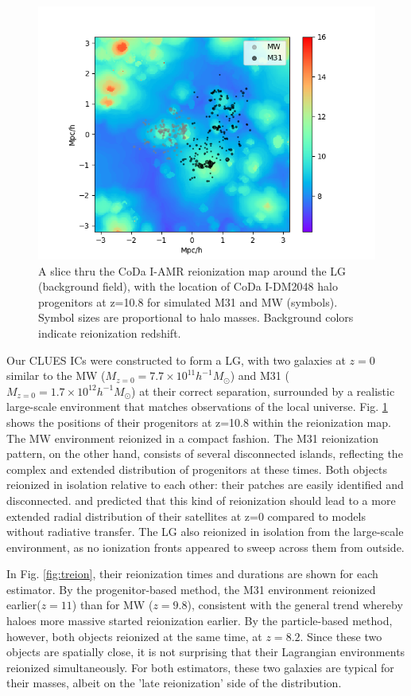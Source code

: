 \documentclass[twocolumn]{aastex61}
\begin{document}
\begin{figure}[ht]
\includegraphics[width=1.2\columnwidth]{img/map_LG_ok.png}
\caption{A slice thru the CoDa I-AMR reionization map around the LG (background field), with the location of CoDa I-DM2048 halo progenitors at z=10.8 for simulated M31 and MW (symbols). Symbol sizes are proportional to halo masses. Background colors indicate reionization redshift.}
\label{fig:LG}
\end{figure}

Our CLUES ICs were constructed to form a LG, with two galaxies at $z = 0$ similar to the MW ($M_{z=0}=7.7\times 10^{11} h^{-1} M_\odot$) and M31 ($M_{z=0}=1.7 \times 10^{12} h^{-1} M_\odot$) at their correct separation, surrounded by a realistic large-scale environment that matches observations of the local universe. Fig. \ref{fig:LG} shows the positions of their progenitors at z=10.8 within the reionization map. The MW environment reionized in a compact fashion. The M31 reionization pattern, on the other hand, consists of several disconnected islands, reflecting the complex and extended distribution of progenitors at these times. Both objects reionized in isolation relative to each other: their patches are easily identified and disconnected. \cite{OCV11} and \cite{GIL15} predicted that this kind of reionization should lead to a more extended radial distribution of their satellites at z=0 compared to models without radiative transfer. The LG also reionized in isolation from the large-scale environment, as no ionization fronts appeared to sweep across them from outside. 

In Fig. \ref{fig:treion}, their reionization times and durations are shown for each estimator. By the progenitor-based method, the M31 environment reionized earlier($z=11$) than for MW ($z=9.8$), consistent with the general trend whereby haloes more massive started reionization earlier. By the particle-based method, however, both objects reionized at the same time, at $z=8.2$. Since these two objects are spatially close, it is not surprising that their Lagrangian environments reionized simultaneously. For both estimators, these two galaxies are typical for their masses, albeit on the 'late reionization' side of the distribution. 
\end{document}

